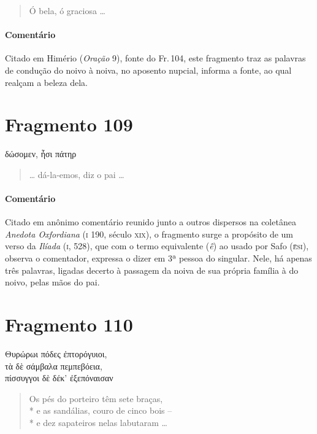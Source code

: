 \begin{verse}
Ó bela, ó graciosa \ldots{}
\end{verse}

{\paragraph{Comentário} Citado em Himério (\textit{Oração} 9), fonte do Fr.\,104, este fragmento traz as palavras de condução do noivo à noiva, no aposento nupcial, informa a fonte, ao qual realçam a beleza dela.}


\pagebreak
\section{Fragmento 109 }

\begin{gkverse}
δώσομεν, ἦσι πάτηρ
\end{gkverse}

\begin{verse}
\ldots{} dá-la-emos, diz o pai \ldots{}
\end{verse}

\paragraph{Comentário} Citado em anônimo comentário reunido junto a outros dispersos na coletânea \textit{Anedota Oxfordiana} (\textsc{i} 190, século \textsc{xix}), o fragmento surge a propósito de um verso da \textit{Ilíada} (\textsc{i}, 528), que com o termo equivalente (\textit{ē̂}) ao usado por Safo (\textsc{ē̂si}), observa o comentador, expressa o dizer em 3ª pessoa do singular. Nele, há apenas três palavras, ligadas decerto à passagem da noiva de sua própria família à do noivo, pelas mãos do pai.


\section{Fragmento 110}

\begin{gkverse}
Θυρώρωι πόδες ἐπτορόγυιοι,\\
τὰ δὲ σάμβαλα πεμπεβόεια,\\
πίσσυγγοι δὲ δέκ’ ἐξεπόναισαν
\end{gkverse}

\begin{verse}
Os pés do porteiro têm sete braças,\\*
e as sandálias, couro de cinco bois -- \\*
e dez sapateiros nelas labutaram \ldots{}
\end{verse}

